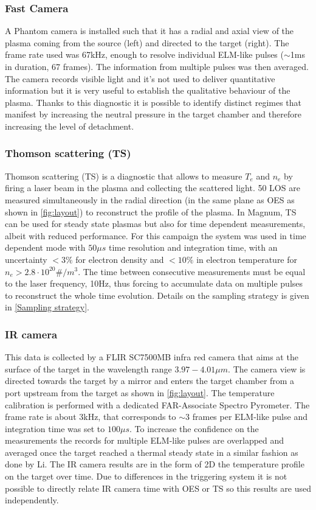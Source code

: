 \subsubsection{Fast Camera}\label{Fast Camera1}
A Phantom camera is installed such that it has a radial and axial view of the plasma coming from the source (left) and directed to the target (right). The frame rate used was 67kHz, enough to resolve individual ELM-like pulses ($\sim$1ms in duration, 67 frames). The information from multiple pulses was then averaged. The camera records visible light and it’s not used to deliver quantitative information but it is very useful to establish the qualitative behaviour of the plasma. Thanks to this diagnostic it is possible to identify distinct regimes that manifest by increasing the neutral pressure in the target chamber and therefore increasing the level of detachment.
\subsubsection{Thomson scattering (TS)}\label{Thomson scattering1}
Thomson scattering (TS) is a diagnostic that allows to measure $T_e$ and $n_e$ by firing a laser beam in the plasma and collecting the scattered light. 50 LOS are measured simultaneously in the radial direction (in the same plane as OES as shown in \autoref{fig:layout}) to reconstruct the profile of the plasma. In Magnum, TS can be used for steady state plasmas but also for time dependent measurements, albeit with reduced performance. For this campaign the system was used in time dependent mode with $50\mu s$ time resolution and integration time, with an uncertainty $<3\%$ for electron density and $<10\%$ in electron temperature for $n_e>2.8 \cdot 10^{20} \#/m^3$. The time between consecutive measurements must be equal to the laser frequency, 10Hz, thus forcing to accumulate data on multiple pulses to reconstruct the whole time evolution. \cite{VanDerMeiden2012} Details on the sampling strategy is given in \autoref{Sampling strategy}.
\subsubsection{IR camera}\label{IR camera1}
This data is collected by a FLIR SC7500MB infra red camera that aims at the surface of the target in the wavelength range $3.97-4.01 \mu m$. The camera view is directed towards the target by a mirror and enters the target chamber from a port upstream from the target as shown in \autoref{fig:layout}. The temperature calibration is performed with a dedicated FAR-Associate Spectro Pyrometer. The frame rate is about 3kHz, that corresponds to $\sim$3 frames per ELM-like pulse and integration time was set to $100 \mu s$. To increase the confidence on the measurements the records for multiple ELM-like pulses are overlapped and averaged once the target reached a thermal steady state in a similar fashion as done by Li. \cite{Li2020} The IR camera results are in the form of 2D the temperature profile on the target over time. Due to differences in the triggering system it is not possible to directly relate IR camera time with OES or TS so this results are used independently.
